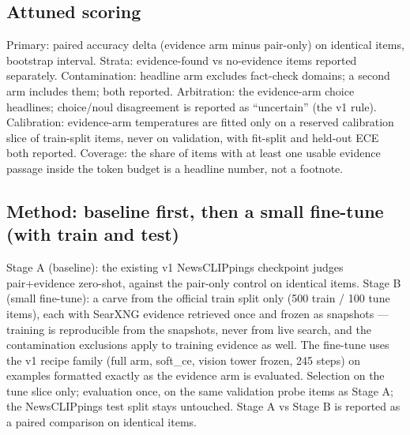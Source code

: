 \documentclass{article}
\begin{document}
\subsection{Attuned scoring}
Primary: paired accuracy delta (evidence arm minus pair-only) on identical items,
bootstrap interval. Strata: evidence-found vs no-evidence items reported
separately. Contamination: headline arm excludes fact-check domains; a second arm
includes them; both reported. Arbitration: the evidence-arm choice headlines;
choice/noul disagreement is reported as ``uncertain'' (the v1 rule). Calibration:
evidence-arm temperatures are fitted only on a reserved calibration slice of
train-split items, never on validation, with fit-split and held-out ECE both
reported. Coverage: the share of items with at least one usable evidence passage
inside the token budget is a headline number, not a footnote.

\subsection{Method: baseline first, then a small fine-tune (with train and test)}
Stage A (baseline): the existing v1 NewsCLIPpings checkpoint judges pair+evidence
zero-shot, against the pair-only control on identical items. Stage B (small
fine-tune): a carve from the official train split only (500 train / 100 tune
items), each with SearXNG evidence retrieved once and frozen as snapshots ---
training is reproducible from the snapshots, never from live search, and the
contamination exclusions apply to training evidence as well. The fine-tune uses
the v1 recipe family (full arm, soft\_ce, vision tower frozen, 245 steps) on
examples formatted exactly as the evidence arm is evaluated. Selection on the
tune slice only; evaluation once, on the same validation probe items as Stage A;
the NewsCLIPpings test split stays untouched. Stage A vs Stage B is reported as
a paired comparison on identical items.
\end{document}
